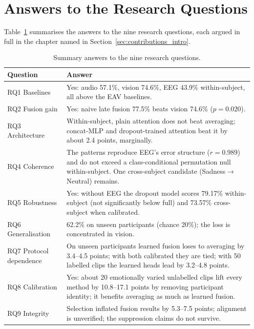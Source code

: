 \section{Answers to the Research Questions}
Table~\ref{tab:rq_summary} summarises the answers to the nine research questions, each argued in full in the chapter named in Section~\ref{sec:contributions_intro}.

\begin{table}[htbp]
\centering
\small
\caption{Summary answers to the nine research questions.}
\label{tab:rq_summary}
\begin{tabular}{p{2.6cm} p{11.0cm}}
\hline
\textbf{Question} & \textbf{Answer} \\
\hline
RQ1 Baselines & Yes: audio 57.1\%, vision 74.6\%, EEG 43.9\% within-subject, all above the EAV baselines. \\
RQ2 Fusion gain & Yes: naive late fusion 77.5\% beats vision 74.6\% ($p = 0.020$). \\
RQ3 Architecture & Within-subject, plain attention does not beat averaging; concat-MLP and dropout-trained attention beat it by about 2.4 points, marginally. \\
RQ4 Coherence & The patterns reproduce EEG's error structure ($r = 0.989$) and do not exceed a class-conditional permutation null within-subject. One cross-subject candidate (Sadness$\rightarrow$Neutral) remains. \\
RQ5 Robustness & Yes: without EEG the dropout model scores 79.17\% within-subject (not significantly below full) and 73.57\% cross-subject when calibrated. \\
RQ6 Generalisation & 62.2\% on unseen participants (chance 20\%); the loss is concentrated in vision. \\
RQ7 Protocol dependence & On unseen participants learned fusion loses to averaging by 3.4--4.5 points; with both calibrated they are tied; with 50 labelled clips the learned heads lead by 3.2--4.8 points. \\
RQ8 Calibration & Yes: about 20 emotionally varied unlabelled clips lift every method by 10.8--17.1 points by removing participant identity; it benefits averaging as much as learned fusion. \\
RQ9 Integrity & Selection inflated fusion results by 5.3--7.5 points; alignment is unverified; the suppression claims do not survive. \\
\hline
\end{tabular}
\end{table}

